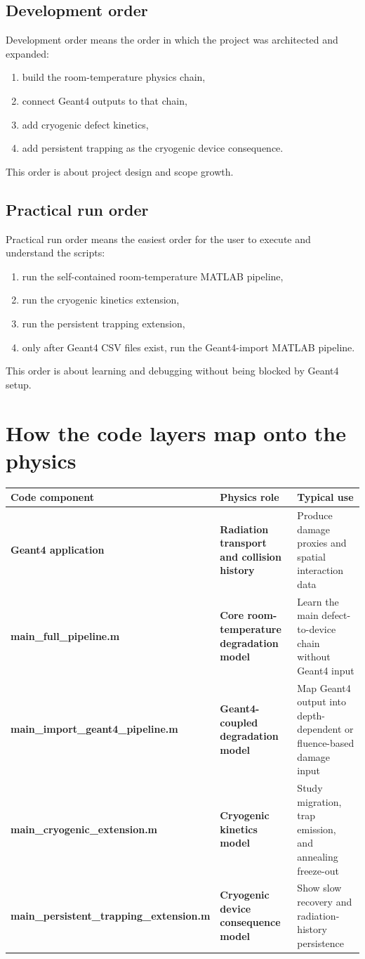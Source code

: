 \documentclass[11pt]{article}
\begin{document}
\subsection{Development order}
Development order means the order in which the project was architected and expanded:
\begin{enumerate}[label=\arabic*.]
    \item build the room-temperature physics chain,
    \item connect Geant4 outputs to that chain,
    \item add cryogenic defect kinetics,
    \item add persistent trapping as the cryogenic device consequence.
\end{enumerate}
This order is about project design and scope growth.

\subsection{Practical run order}
Practical run order means the easiest order for the user to execute and understand the scripts:
\begin{enumerate}[label=\arabic*.]
    \item run the self-contained room-temperature MATLAB pipeline,
    \item run the cryogenic kinetics extension,
    \item run the persistent trapping extension,
    \item only after Geant4 CSV files exist, run the Geant4-import MATLAB pipeline.
\end{enumerate}
This order is about learning and debugging without being blocked by Geant4 setup.

\section{How the code layers map onto the physics}
\begin{center}
\begin{tabularx}{\textwidth}{>{\bfseries}p{} >{\bfseries}p{} Y}
\toprule
Code component & Physics role & Typical use \\
\midrule
Geant4 application & Radiation transport and collision history & Produce damage proxies and spatial interaction data \\
main\_full\_pipeline.m & Core room-temperature degradation model & Learn the main defect-to-device chain without Geant4 input \\
main\_import\_geant4\_pipeline.m & Geant4-coupled degradation model & Map Geant4 output into depth-dependent or fluence-based damage input \\
main\_cryogenic\_extension.m & Cryogenic kinetics model & Study migration, trap emission, and annealing freeze-out \\
main\_persistent\_trapping\_extension.m & Cryogenic device consequence model & Show slow recovery and radiation-history persistence \\
\bottomrule
\end{tabularx}
\end{center}
\end{document}
